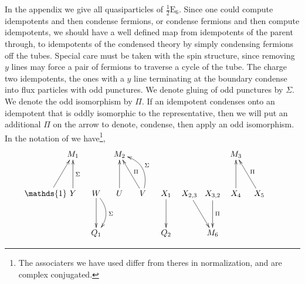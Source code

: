 \documentclass[12pt,a4paper]{article}
\newcounter{arrow}
\newcommand{\halfesix}{\frac{1}{2}\text{E}_6}
\begin{document}
In the appendix we give all quasiparticles of $\halfesix$. 
Since one could compute idempotents and then condense fermions, or condense fermions and then compute idempotents, we should have a well defined map from idempotents of the parent through, to idempotents of the condensed theory by simply condensing fermions off the tubes. 
Special care must be taken with the spin structure, since removing $y$ lines may force a pair of fermions to traverse a cycle of the tube. 
The charge two idempotents, the ones with a $y$ line terminating at the boundary condense into flux particles with odd punctures. 
We denote gluing of odd punctures by $\Sigma$.
We denote the odd isomorphism by $\Pi$. 
If an idempotent condenses onto an idempotent that is oddly isomorphic to the representative, then we will put an additional $\Pi$ on the arrow to denote, condense, then apply an odd isomorphism.
In the notation of \cite{Hong2008} we have\footnote{The associaters we have used differ from theres in normalization, and are complex conjugated.}, 
\begin{align}
\xymatrix @!0 @M=1mm @C=10mm{
& &M_1 && M_2 && &&& M_3 &&  \\
 \\
 \quad&\mathds{1} \ar[ruu] \quad & Y \ar[uu]_{\Sigma} & W\ar[dd] \ar@/^1pc/[dd]^{\Sigma} & U\ar[uu] & V \ar[uul]_\Pi \ar@/_1.3pc/[uul]_\Sigma & X_1 \ar[dd] & X_{2,3}\ar[ddr] &X_{3,2} \ar[dd]^\Pi& X_4\ar[uu] & X_5\ar[uul]_\Pi &  \\
\\
&&&Q_1& &&Q_2 &&M_6& &&  \\
}
\end{align}
\end{document}
